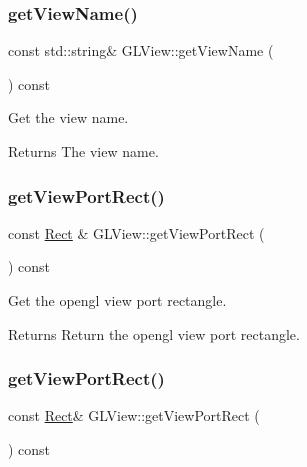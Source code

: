 \subsubsection{\texorpdfstring{get\+View\+Name()}{getViewName()}\hspace{0.1cm}{\footnotesize\ttfamily [2/2]}}
{\footnotesize\ttfamily const std\+::string\& G\+L\+View\+::get\+View\+Name (\begin{DoxyParamCaption}{ }\end{DoxyParamCaption}) const}

Get the view name.

\begin{DoxyReturn}{Returns}
The view name. 
\end{DoxyReturn}
\mbox{\label{classGLView_a8372ba3ae530fbf428cda94ba20b18fb}} 
\subsubsection{\texorpdfstring{get\+View\+Port\+Rect()}{getViewPortRect()}\hspace{0.1cm}{\footnotesize\ttfamily [1/2]}}
{\footnotesize\ttfamily const \hyperlink{classRect}{Rect} \& G\+L\+View\+::get\+View\+Port\+Rect (\begin{DoxyParamCaption}{ }\end{DoxyParamCaption}) const}

Get the opengl view port rectangle.

\begin{DoxyReturn}{Returns}
Return the opengl view port rectangle. 
\end{DoxyReturn}
\mbox{\label{classGLView_ac34de16bd3fd4eb1a524e77b18f47546}} 
\subsubsection{\texorpdfstring{get\+View\+Port\+Rect()}{getViewPortRect()}\hspace{0.1cm}{\footnotesize\ttfamily [2/2]}}
{\footnotesize\ttfamily const \hyperlink{classRect}{Rect}\& G\+L\+View\+::get\+View\+Port\+Rect (\begin{DoxyParamCaption}{ }\end{DoxyParamCaption}) const}

